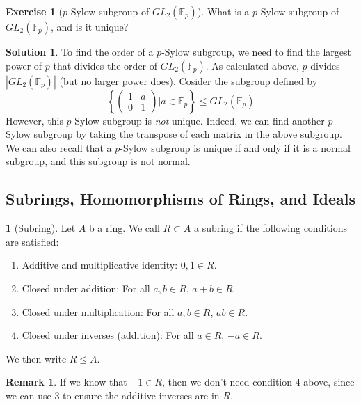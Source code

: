 \documentclass[12pt]{article}
\theoremstyle{definition}
\newtheorem{definition}{\color{NavyBlue}{\textbf{Definition}}}
\newtheorem{exercise}{\color{YellowOrange}Exercise}
\newtheorem{remark}{Remark}
\theoremstyle{definition}
\newtheorem{solution}{\color{Goldenrod}Solution}
\begin{document}
\begin{exercise}[$p$-Sylow subgroup of $GL_2(\mathbb{F}_p)$]
	What is a $p$-Sylow subgroup of $GL_2(\mathbb{F}_p)$, and is it unique?
\end{exercise}
\begin{solution}
	To find the order of a $p$-Sylow subgroup, we need to find the largest power of $p$ that divides the order of 
	$GL_2(\mathbb{F}_p)$. As calculated above, $p$ divides $|GL_2(\mathbb{F}_p)|$ (but no larger power does). Cosider the subgroup defined by
	\begin{equation}
		\left\{
		\begin{pmatrix}
		1 & a \\
		0 & 1
		\end{pmatrix}
		\bigg\vert 
		a \in \mathbb{F}_p
		\right\} \leq
		GL_2(\mathbb{F}_p)
	\end{equation}
	However, this $p$-Sylow subgroup is \emph{not} unique. Indeed, we can find another $p$-Sylow subgroup by taking the transpose of each matrix in the above subgroup. We can also recall that a $p$-Sylow subgroup is unique if and only if it is a normal subgroup, and this subgroup is not normal. 
\end{solution}

\subsection{Subrings, Homomorphisms of Rings, and Ideals}
\begin{definition}[Subring]
	Let $A$ b a ring. We call $R \subset A$ a subring if the following conditions are satisfied:
	\begin{enumerate}
		\item Additive and multiplicative identity: $0,1 \in R$.
		\item Closed under addition: For all $a,b \in R$, $a+b \in R$.
		\item Closed under multiplication: For all $a,b \in R$, $ab \in R$.
		\item Closed under inverses (addition): For all $a \in R$, $-a \in R$. 
	\end{enumerate}
	We then write $R \leq A$.
\end{definition}

\begin{remark}
	If we know that $-1 \in R$, then we don't need condition $4$ above, since we can use $3$ to ensure the additive inverses are in $R$.
\end{remark}
\end{document}
